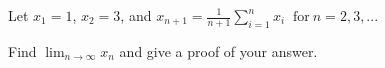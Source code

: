 Let $x_1 = 1$, $x_2 = 3$, and $\displaystyle{
  x_{n+1} = \frac{1}{n + 1} \sum_{i = 1}^n x_i \ \textrm{ for} \ n = 2, 3, ...
}$

Find $\displaystyle{ \lim_{n \to \infty} x_n }$ and give a proof of your answer.

